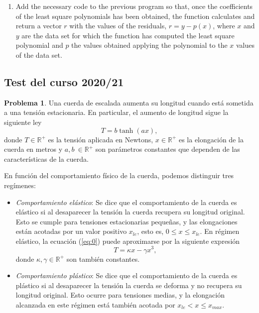 \begin{paracol}{2}
\begin{enumerate}
\item Add the necessary code to the previous program so that, once the coefficients of the least square polynomials has been obtained, the function calculates and return a vector $r$ with the values of the residuals, $r = y -p(x)$, where $x$ and $y$ are the data set for which the function has computed the least square polynomial and $p$ the values obtained applying the polynomial to the $x$ values of the data set.
\end{enumerate}
\end{paracol}
\begin{paracol}{2}
\section{Test del curso 2020/21}

\noindent \textbf{Problema 1}. Una cuerda de escalada aumenta su longitud cuando está sometida a una tensión estacionaria. En particular, el aumento de longitud sigue la siguiente ley
\begin{equation}\label{eq:0}
T = b\tanh(ax),
\end{equation}
donde $T \in \mathbb{R}^+$ es la tensión aplicada en Newtons, $x \in \mathbb{R}^+$ es la elongación de la cuerda en metros y $a, b \ \in \mathbb{R}^+$ son parámetros constantes que dependen de las características de la cuerda.

En función del comportamiento físico de la cuerda, podemos distinguir tres regímenes:

\begin{itemize}
	\item \emph{Comportamiento elástico}: Se dice que el comportamiento de la cuerda es elástico si al desaparecer la tensión la cuerda recupera su longitud original. Esto se cumple para tensiones estacionarias pequeñas, y las elongaciones están acotadas por un valor positivo $x_{le}$, esto es, $0 \le x \le x_{le}$. En régimen elástico, la ecuación (\ref{eq:0}) puede aproximarse por la siguiente expresión
\begin{equation}\label{eq:1}
T = \kappa x - \gamma x^3,
\end{equation}
donde $\kappa,\gamma \in \mathbb{R}^+$ son también constantes.

\item \emph{Comportamiento plástico}: Se dice que el comportamiento de la cuerda es plástico si al desaparecer la tensión la cuerda se deforma y no recupera su longitud original. Esto ocurre para tensiones medias, y la elongación alcanzada en este régimen está también acotada por $x_{le} < x \le x_{max}$.


\end{itemize}
\end{paracol}
